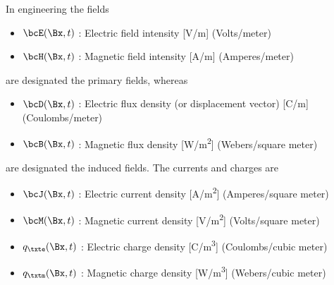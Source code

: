 %
%
In engineering the fields

\begin{itemize}
	\item \( \bcE(\Bx, t) \) : Electric field intensity [\si{V/m}] (Volts/meter)
	\item \( \bcH(\Bx, t) \) : Magnetic field intensity [\si{A/m}] (Amperes/meter)
\end{itemize}

are designated the primary fields, whereas

\begin{itemize}
	\item \( \bcD(\Bx, t) \) : Electric flux density (or displacement vector) [\si{C/m}] (Coulombs/meter)
	\item \( \bcB(\Bx, t) \) : Magnetic flux density [\si{W/m^2}] (Webers/square meter)
\end{itemize}

are designated the induced fields.  The currents and charges are

\begin{itemize}
	\item \( \bcJ(\Bx, t) \) : Electric current density [\si{A/m^2}] (Amperes/square meter)
	\item \( \bcM(\Bx, t) \) : Magnetic current density [\si{V/m^2}] (Volts/square meter)
	\item \( q_\txte(\Bx, t) \) : Electric charge density [\si{C/m^3}] (Coulombs/cubic meter)
	\item \( q_\txtm(\Bx, t) \) : Magnetic charge density [\si{W/m^3}] (Webers/cubic meter)
\end{itemize}
